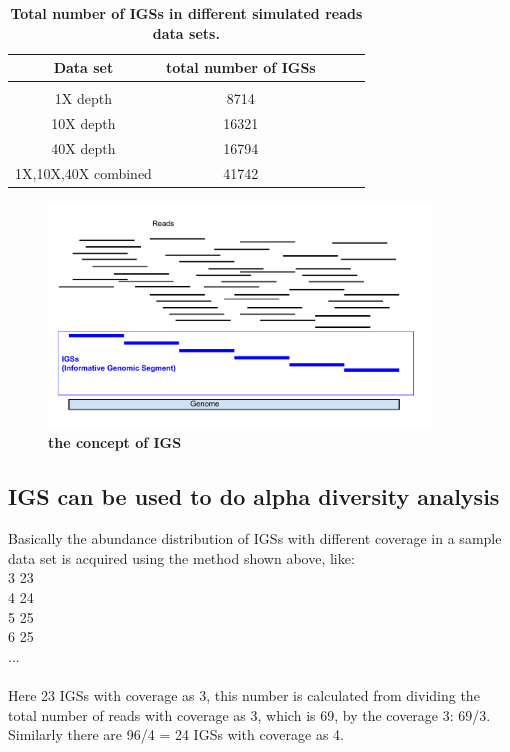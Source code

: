 \begin{table}[!ht]
\caption{
\bf{Total number of IGSs in different simulated reads data sets.}
}
\begin{tabular}{ |c | c |c| c|c| }
Data set & total number of IGSs \\
\hline \\
1X depth                   & 8714  \\
10X depth                  & 16321  \\
40X depth                  & 16794 \\
1X,10X,40X combined        & 41742 \\
\end{tabular}
\begin{flushleft}
\end{flushleft}
\label{table:IGSs}
\end{table}


\begin{figure}[!ht]
\centerline{\includegraphics[width=4in]{./figures/IGSs_figure.pdf}}
\caption{\bf the concept of IGS}
\label{fig:IGS}
\end{figure}





\subsection{IGS can be used to do alpha diversity analysis}

Basically the abundance distribution of IGSs with different coverage in a sample data set is acquired using the method shown above, like:
\\
3 23\\
4 24\\
5 25\\
6 25\\
...\\
\\
Here 23 IGSs with coverage as 3, this number is calculated from dividing the total number of reads with coverage as 3, which is 69, by the coverage 3: 69/3. Similarly there are 96/4 = 24 IGSs with coverage as 4.

